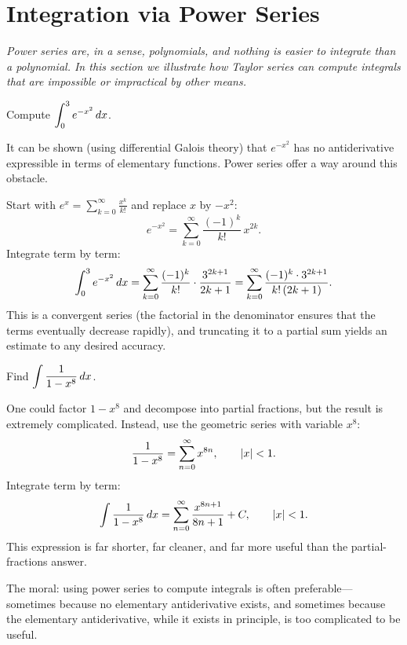 \section{Integration via Power Series}
\label{sec:14.12}

\textit{Power series are, in a sense, polynomials, and nothing is easier to integrate than a polynomial.  In this section we illustrate how Taylor series can compute integrals that are impossible or impractical by other means.}

\begin{example}
\label{ex:14-11}
Compute $\displaystyle\int_{0}^{3}e^{-x^{2}}\,dx$.

It can be shown (using differential Galois theory) that $e^{-x^{2}}$ has no antiderivative expressible in terms of elementary functions.  Power series offer a way around this obstacle.

Start with $e^{x}=\sum_{k=0}^{\infty}\frac{x^{k}}{k!}$ and replace $x$ by $-x^{2}$:
\[
  e^{-x^{2}}
  = \sum_{k=0}^{\infty}\frac{(-1)^{k}}{k!}\,x^{2k}.
\]
Integrate term by term:
\[
  \int_{0}^{3}e^{-x^{2}}\,dx
  = \sum_{k=0}^{\infty}\frac{(-1)^{k}}{k!}\cdot\frac{3^{2k+1}}{2k+1}
  = \sum_{k=0}^{\infty}\frac{(-1)^{k}\cdot 3^{2k+1}}{k!\,(2k+1)}.
\]
This is a convergent series (the factorial in the denominator ensures that the terms eventually decrease rapidly), and truncating it to a partial sum yields an estimate to any desired accuracy.
\end{example}

\begin{example}
\label{ex:14-12}
Find $\displaystyle\int\frac{1}{1-x^{8}}\,dx$.

One could factor $1-x^{8}$ and decompose into partial fractions, but the result is extremely complicated.  Instead, use the geometric series with variable $x^{8}$:
\[
  \frac{1}{1-x^{8}} = \sum_{n=0}^{\infty}x^{8n}, \qquad \left\lvert x \right\rvert<1.
\]
Integrate term by term:
\[
  \int\frac{1}{1-x^{8}}\,dx
  = \sum_{n=0}^{\infty}\frac{x^{8n+1}}{8n+1} + C, \qquad \left\lvert x \right\rvert<1.
\]
This expression is far shorter, far cleaner, and far more useful than the partial-fractions answer.
\end{example}

\begin{remark}
The moral: using power series to compute integrals is often preferable---sometimes because no elementary antiderivative exists, and sometimes because the elementary antiderivative, while it exists in principle, is too complicated to be useful.
\end{remark}

